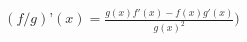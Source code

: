 \documentclass[preview]{standalone}
\begin{document}
\begin{align*}
(f/g)’(x) = \frac{g(x)f'(x) - f(x)g'(x)}{g(x)^2})
\end{align*}
\end{document}
